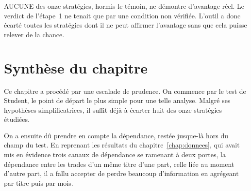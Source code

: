 AUCUNE des onze stratégies, hormis le témoin, ne
démontre d'avantage réel. Le verdict de l'étape~1 ne tenait que par
une condition non vérifiée. L'outil a donc écarté toutes les stratégies
dont il ne peut affirmer l'avantage sans que cela puisse relever de la chance.


\section{Synthèse du chapitre}
\label{sec:b1-synthese}
Ce chapitre a procédé par une escalade de prudence. On commence par le test
de Student, le point de départ le plus simple pour une telle analyse. Malgré
ses hypothèses simplificatrices, il suffit déjà à écarter huit des onze
stratégies étudiées.

On a ensuite dû prendre en compte la dépendance, restée jusque-là hors du
champ du test. En reprenant les résultats du chapitre~\ref{chap:donnees}, qui
avait mis en évidence trois canaux de dépendance se ramenant à deux portes,
la dépendance entre les trades d'un même titre d'une part, celle liée au
moment d'autre part, il a fallu accepter de perdre beaucoup d'information en
agrégeant par titre puis par mois.

